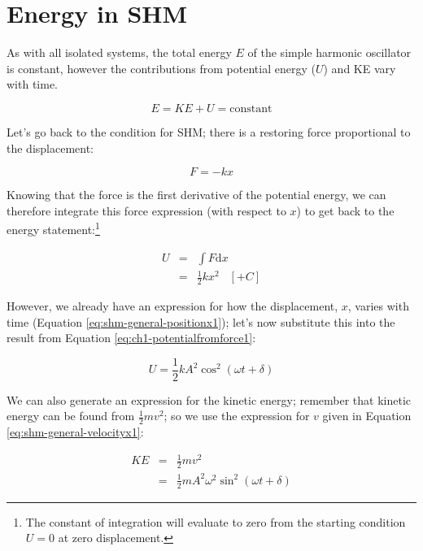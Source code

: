 \documentclass[
]{book}
\begin{document}
\hypertarget{sec-ch1-shm-energy1}{%
\section{Energy in SHM}\label{sec-ch1-shm-energy1}}

As with all isolated systems, the total energy \(E\) of the simple harmonic oscillator is constant, however the contributions from potential energy (\(U\)) and KE vary with time.

\begin{equation}
E = KE + U = \textrm{constant}
\end{equation}

Let's go back to the condition for SHM; there is a restoring force proportional to the displacement:

\begin{equation}
F = -kx
\end{equation}

Knowing that the force is the first derivative of the potential energy, we can therefore integrate this force expression (with respect to \(x\)) to get back to the energy statement:\footnote{The constant of integration will evaluate to zero from the starting condition \(U = 0\) at zero displacement.}

\begin{equation}
\begin{array}{rcl}
U &=& \int F \mathrm{d}x \\
& =& \frac{1}{2}kx^2 \hspace{10pt} [+C]
\end{array}
\label{eq:ch1-potentialfromforce1}
\end{equation}

However, we already have an expression for how the displacement, \(x\), varies with time (Equation \eqref{eq:shm-general-positionx1}); let's now substitute this into the result from Equation \eqref{eq:ch1-potentialfromforce1}:

\begin{equation}
U = \frac{1}{2}kA^2 \cos^2 (\omega t + \delta)
\label{eq:ch1-potentialfromforce2}
\end{equation}

We can also generate an expression for the kinetic energy; remember that kinetic energy can be found from \(\frac{1}{2}mv^2\); so we use the expression for \(v\) given in Equation \eqref{eq:shm-general-velocityx1}:

\begin{equation}
\begin{array}{rcl}
KE &=& \frac{1}{2} mv^2 \\
& =& \frac{1}{2} m A^2 \omega^2 \sin^2 (\omega t + \delta)
\end{array}
\label{eq:ch1-potentialfromforce3}
\end{equation}
\end{document}
